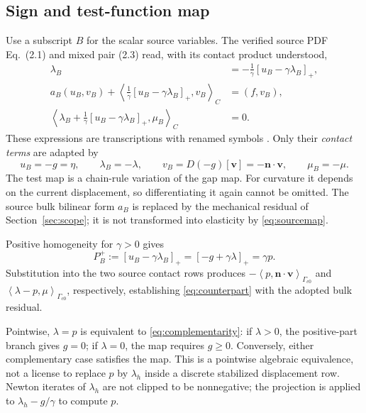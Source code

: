 \documentclass[preprint,11pt]{elsarticle}
\numberwithin{equation}{section}
\newcommand{\bv}{\boldsymbol{v}}
\newcommand{\bn}{\boldsymbol{n}}
\newcommand{\Gc}{\Gamma_{c0}}
\newcommand{\ip}[2]{\left\langle #1,#2\right\rangle_{\Gc}}
\newcommand{\pos}[1]{\left[#1\right]_+}
\begin{document}
\subsection{Sign and test-function map}
Use a subscript $B$ for the scalar source variables. The verified source
PDF Eq.~(2.1) and mixed pair (2.3) read, with its contact product understood,
\begin{align}
 \lambda_B&=-\frac1\gamma\pos{u_B-\gamma\lambda_B},
 \label{eq:sourceprojection}\\
 a_B(u_B,v_B)+\left\langle\frac1\gamma
       \pos{u_B-\gamma\lambda_B},v_B\right\rangle_C
       &=(f,v_B),\label{eq:sourcerow1}\\
 \left\langle\lambda_B+\frac1\gamma
       \pos{u_B-\gamma\lambda_B},\mu_B\right\rangle_C&=0.
 \label{eq:sourcerow2}
\end{align}
These expressions are transcriptions with renamed symbols
\cite[Section 2, PDF Eqs.~(2.1), (2.3)]{BHLv1}.
Only their \emph{contact terms} are adapted by
\begin{equation}
 u_B=-g=\eta,\qquad \lambda_B=-\lambda,\qquad
 v_B=D(-g)[\bv]=-\bn\cdot\bv,\qquad \mu_B=-\mu.
 \label{eq:sourcemap}
\end{equation}
The test map is a chain-rule variation of the gap map. For curvature it
depends on the current displacement, so differentiating it again cannot
be omitted. The source bulk bilinear form $a_B$ is replaced by the
mechanical residual of Section~\ref{sec:scope}; it is not transformed into
elasticity by \eqref{eq:sourcemap}.

Positive homogeneity for $\gamma>0$ gives
\begin{equation}
 P_B^+:=\pos{u_B-\gamma\lambda_B}
       =\pos{-g+\gamma\lambda}=\gamma p.
 \label{eq:positivehomogeneity}
\end{equation}
Substitution into the two source contact rows produces
$-\ip{p}{\bn\cdot\bv}$ and $\ip{\lambda-p}{\mu}$,
respectively, establishing \eqref{eq:counterpart} with the adopted
bulk residual.

Pointwise, $\lambda=p$ is equivalent to \eqref{eq:complementarity}:
if $\lambda>0$, the positive-part branch gives $g=0$; if $\lambda=0$,
the map requires $g\geq0$. Conversely, either complementary case satisfies
the map. This is a pointwise algebraic equivalence, not a license to
replace $p$ by $\lambda_h$ inside a discrete stabilized displacement row.
Newton iterates of $\lambda_h$ are not clipped to be nonnegative; the
projection is applied to $\lambda_h-g/\gamma$ to compute $p$.
\end{document}

